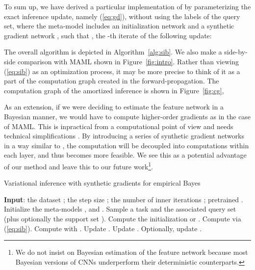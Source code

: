 \documentclass{article} \usepackage{iclr2020_conference,times}
\def\eqref#1{(\ref{#1})}
\begin{document}
To sum up, we have derived a particular implementation of  by parameterizing the exact inference update, 
namely \eqref{eq:gd}, without using the labels of the query set,
where the meta-model  includes an initialization network  and a synthetic gradient network ,
such that , the -th iterate of the following update: 

The overall algorithm is depicted in Algorithm~\ref{alg:sib}. 
We also make a side-by-side comparison with MAML shown in Figure~\ref{fig:intro}.
Rather than viewing \eqref{eq:sib} as an optimization process, it may be more precise to think of it as a part of the computation graph created in the forward-propagation. 
The computation graph of the amortized inference is shown in Figure~\ref{fig:cg},

As an extension, if we were deciding to estimate the feature network  in a Bayesian manner, 
we would have to compute higher-order gradients as in the case of MAML.
This is inpractical from a computational point of view and needs technical simplifications \citep{nichol2018first}. 
By introducing a series of synthetic gradient networks in a way similar to \citet{jaderberg2017decoupled}, the computation will be decoupled into computations within each layer, and thus becomes more feasible. 
We see this as a potential advantage of our method
and leave this to our future work\footnote{We do not insist on Bayesian estimation of the feature network because 
most Bayesian versions of CNNs underperform their deterministic counterparts.}.

\begin{algorithm}[t]
  \caption{Variational inference with synthetic gradients for empirical Bayes}
  \label{alg:sib}
  \begin{algorithmic}[1]
    \State \textbf{Input}: the dataset ; the step size ; the number of inner iterations ; pretrained .
    \State Initialize the meta-models , and .
      \State Sample a task  and the associated query set  (plus optionally the support set ).
      \State Compute the initialization  or .
      \For{} 
        \State Compute  via \eqref{eq:sib}.
      \EndFor
      \State Compute  with .
      \State Update .
      \vspace{-0.2mm}
      \State Update .
      \State Optionally, update .
    \EndWhile
\end{algorithmic}
\end{algorithm}
\end{document}
